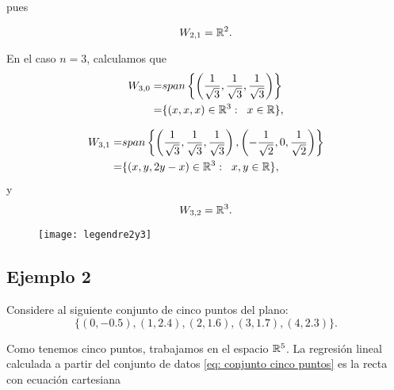 {pues

\begin{equation}
\label{eq1: 1Dic}
W_{2,1}= \mathbb{R}^{2}.
\end{equation}


En el caso $n=3$, calculamos que
\begin{align*}
W_{3,0}= & span \left\{
\left( \frac{1}{\sqrt3}, \frac{1}{\sqrt3},
\frac{1}{\sqrt3} \right) \right\}  \\
= & \{ (x,x,x) \in \mathbb{R}^{3}: \hspace{0.2cm} x \in \mathbb{R} \},
\end{align*}

\begin{align}
\label{eq2: 1Dic}
W_{3,1}= & span \left\{ \left( \frac{1}{\sqrt3}, \frac{1}{\sqrt3},
\frac{1}{\sqrt3} \right) ,
\left( -\frac{1}{\sqrt2}, 0,  \frac{1}{\sqrt2} \right) \right\}
\nonumber \\
= & \{ (x,y,2y-x) \in \mathbb{R}^{3}: \hspace{0.2cm} x,y \in \mathbb{R} \},
\end{align}
y
\[
W_{3,2}=\mathbb{R}^{3}.
\]

\begin{figure}[H]
	\centering
	\texttt{[image: legendre2y3]} 
\end{figure}	
	 




\subsection{Ejemplo 2}
\label{subs: ejm 2}

Considere al siguiente conjunto de cinco
puntos del plano:
\begin{equation} \label{eq: conjunto cinco puntos}
\{ (0,-0.5), (1,2.4), (2, 1.6), (3,1.7), (4, 2.3) \}.
\end{equation}


Como tenemos cinco puntos, trabajamos
en el espacio $\mathbb{R}^{5}$. 
La regresión lineal calculada a partir
del conjunto de datos
\eqref{eq: conjunto cinco puntos}
es la recta
con ecuación cartesiana

}
